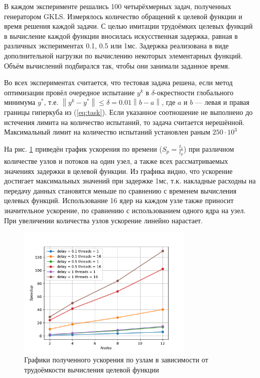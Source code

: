 \documentclass[a4paper]{article}
\begin{document}
В каждом эксперименте решались 100 четырёхмерных задач, полученных генератором GKLS.
Измерялось количество обращений к целевой функции и время решения каждой задачи.
С целью имитации трудоёмких целевых функций в вычисление каждой функции вносилась искусственная задержка,
равная в различных экспериментах 0.1, 0.5 или 1мс. Задержка реализована в виде дополнительной
нагрузки по вычислению некоторых элементарных функций. Объём вычислений подбирался так, чтобы они занимали заданное время.

Во всех экспериментах считается, что тестовая задача решена, если метод оптимизации провёл очередное испытание \(y^k\) в
\(\delta\)-окрестности глобального минимума \(y^*\), т.е. $\left\|y^k-
y^*\right\|\leqslant \delta = 0.01\left\|b-a\right\|$, где \(a\) и \(b\) --- левая и правая границы гиперкуба из (\ref{eq:task}).
Если указанное соотношение не выполнено до истечения лимита на количество испытаний, то задача считается нерешённой.
Максимальный лимит на количество испытаний установлен раным $250\cdot 10^3$

На рис. \ref{fig:speedup_nodes} приведён график ускорения по времени ($S_p=\frac{t_1}{t_p}$)
при различном количестве узлов и потоков на один узел, а также всех рассматриваемых значениях задержки в
целевой функции. Из графика видно, что ускорение достигает максимальных значений при задержке 1мс, т.к.
накладные расходны на передачу данных становятся меньше по сравнению с временем вычисления целевых функций.
Использование 16 ядер на каждом узле также приносит значительное ускорение, по сравнению с использованием одного
ядра на узел. При увеличении количества узлов ускорение линейно нарастает.

\begin{figure}[H]
  \center
  \includegraphics[width=0.75\textwidth]{gpu_mpi/gklsh4d/speedup_nodes.pdf}
  \caption{Графики полученного ускорения по узлам в зависимости от трудоёмкости вычисления целевой функции}
  \label{fig:speedup_nodes}
\end{figure}
\end{document}
